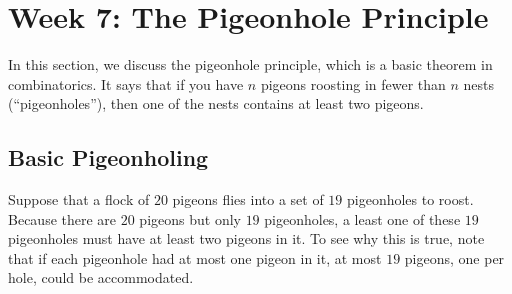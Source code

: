 \documentclass[../main.tex]{subfiles}
\begin{document}
\section{Week 7: The Pigeonhole Principle}
In this section, we discuss the pigeonhole principle, which is a basic theorem in combinatorics. It says that if you have $n$ pigeons roosting in fewer than $n$ nests (``pigeonholes''), then one of the nests contains at least two pigeons.

\subsection{Basic Pigeonholing}
Suppose that a flock of $20$ pigeons flies into a set of $19$ pigeonholes to roost. Because there are $20$ pigeons but only $19$ pigeonholes, a least one of these $19$ pigeonholes must have at least two pigeons in it. To see why this is true, note that if each pigeonhole had at most one pigeon in it, at most $19$ pigeons, one per hole, could be accommodated. %
\end{document}
